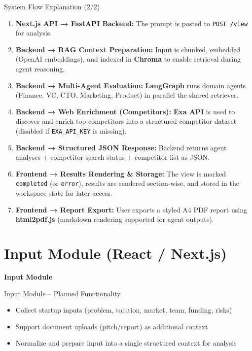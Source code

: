 \documentclass{beamer}
\begin{document}
\begin{frame}{System Flow Explanation (2/2)}
\small
\setcounter{enumi}{5}
\begin{enumerate}
    \item \textbf{Next.js API → FastAPI Backend:}  
    The prompt is posted to \texttt{POST /view} for analysis.

    \item \textbf{Backend → RAG Context Preparation:}  
    Input is chunked, embedded (OpenAI embeddings), and indexed in \textbf{Chroma} to enable retrieval during agent reasoning.

    \item \textbf{Backend → Multi-Agent Evaluation:}  
    \textbf{LangGraph} runs domain agents (Finance, VC, CTO, Marketing, Product) in parallel the shared retriever.

    \item \textbf{Backend → Web Enrichment (Competitors):}  
    \textbf{Exa API} is used to discover and enrich top competitors into a structured competitor dataset (disabled if \texttt{EXA\_API\_KEY} is missing).

    \item \textbf{Backend → Structured JSON Response:}  
    Backend returns agent analyses + competitor search status + competitor list as JSON.

    \item \textbf{Frontend → Results Rendering \& Storage:}  
    The view is marked \texttt{completed} (or \texttt{error}), results are rendered section-wise, and stored in the workspace state for later access.

    \item \textbf{Frontend → Report Export:}  
    User exports a styled A4 PDF report using \textbf{html2pdf.js} (markdown rendering supported for agent outputs).
\end{enumerate}
\end{frame}


\section{Input Module (React / Next.js)}

\begin{frame}
\centering
\Huge \textbf{Input Module}
\end{frame}

\begin{frame}{Input Module – Planned Functionality}
\begin{itemize}
    \item Collect startup inputs (problem, solution, market, team, funding, risks)
    \item Support document uploads (pitch/report) as additional context
    \item Normalize and prepare input into a single structured context for analysis
\end{itemize}
\end{frame}
\end{document}
